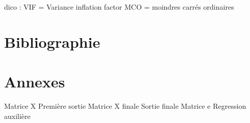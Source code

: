 \documentclass{article}
\begin{document}
dico : VIF = Variance inflation factor
MCO = moindres carrés ordinaires
\newpage
\section{Bibliographie}
\printbibliography

\appendix
\section{Annexes}
Matrice X
Première sortie
Matrice X finale
Sortie finale
Matrice e
Regression auxilière
\end{document}
